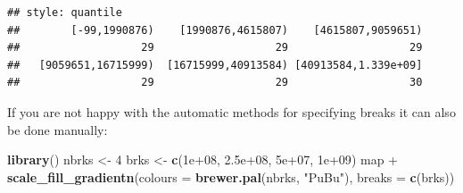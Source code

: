 \documentclass[]{article}
\newenvironment{Shaded}{}{}
\newcommand{\KeywordTok}[1]{\textcolor[rgb]{0.00,0.44,0.13}{\textbf{{#1}}}}
\newcommand{\DataTypeTok}[1]{\textcolor[rgb]{0.56,0.13,0.00}{{#1}}}
\newcommand{\DecValTok}[1]{\textcolor[rgb]{0.25,0.63,0.44}{{#1}}}
\newcommand{\FloatTok}[1]{\textcolor[rgb]{0.25,0.63,0.44}{{#1}}}
\newcommand{\StringTok}[1]{\textcolor[rgb]{0.25,0.44,0.63}{{#1}}}
\newcommand{\CommentTok}[1]{\textcolor[rgb]{0.38,0.63,0.69}{\textit{{#1}}}}
\newcommand{\NormalTok}[1]{{#1}}
\begin{document}
\begin{verbatim}
## style: quantile
##        [-99,1990876)    [1990876,4615807)    [4615807,9059651) 
##                   29                   29                   29 
##   [9059651,16715999)  [16715999,40913584) [40913584,1.339e+09] 
##                   29                   29                   30
\end{verbatim}

\begin{Shaded}
\end{Shaded}

If you are not happy with the automatic methods for specifying breaks it
can also be done manually:

\begin{Shaded}
\begin{Highlighting}[]
\KeywordTok{library}\NormalTok{()}
\NormalTok{nbrks <- }\DecValTok{4}
\NormalTok{brks <- }\KeywordTok{c}\NormalTok{(}\FloatTok{1e+08}\NormalTok{, }\FloatTok{2.5e+08}\NormalTok{, }\FloatTok{5e+07}\NormalTok{, }\FloatTok{1e+09}\NormalTok{)}
\NormalTok{map + }\KeywordTok{scale_fill_gradientn}\NormalTok{(}\DataTypeTok{colours =} \KeywordTok{brewer.pal}\NormalTok{(nbrks, }\StringTok{"PuBu"}\NormalTok{), }\DataTypeTok{breaks =} \KeywordTok{c}\NormalTok{(brks))}
\end{Highlighting}
\end{Shaded}
\end{document}

